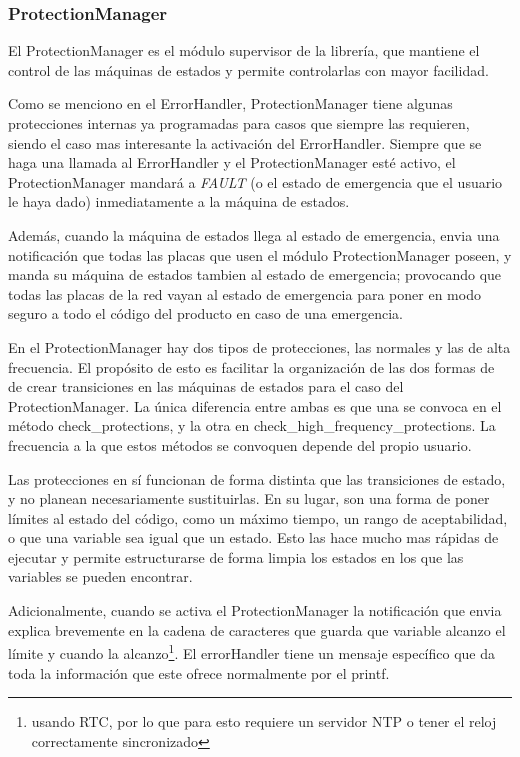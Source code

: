 \documentclass{report}
\begin{document}
\subsubsection{ProtectionManager}
El ProtectionManager es el módulo supervisor de la librería, que mantiene el control de las máquinas de estados y permite controlarlas con mayor facilidad. 
\par \vspace{0.3cm}
Como se menciono en el ErrorHandler, ProtectionManager tiene algunas protecciones internas ya programadas para casos que siempre las requieren, siendo el caso mas interesante la activación del ErrorHandler. Siempre que se haga una llamada al ErrorHandler y el ProtectionManager esté activo, el ProtectionManager mandará a \textit{FAULT} (o el estado de emergencia que el usuario le haya dado) inmediatamente a la máquina de estados. 
\par \vspace{0.3cm}
Además, cuando la máquina de estados llega al estado de emergencia, envia una notificación que todas las placas que usen el módulo ProtectionManager poseen, y manda su máquina de estados tambien al estado de emergencia; provocando que todas las placas de la red vayan al estado de emergencia para poner en modo seguro a todo el código del producto en caso de una emergencia. 
\par \vspace{0.3cm}
En el ProtectionManager hay dos tipos de protecciones, las normales y las de alta frecuencia. El propósito de esto es facilitar la organización de las dos formas de de crear transiciones en las máquinas de estados para el caso del ProtectionManager. La única diferencia entre ambas es que una se convoca en el método check\_protections, y la otra en check\_high\_frequency\_protections. La frecuencia a la que estos métodos se convoquen depende del propio usuario. 
\par \vspace{0.3cm}
Las protecciones en sí funcionan de forma distinta que las transiciones de estado, y no planean necesariamente sustituirlas. En su lugar, son una forma de poner límites al estado del código, como un máximo tiempo, un rango de aceptabilidad, o que una variable sea igual que un estado. Esto las hace mucho mas rápidas de ejecutar y permite estructurarse de forma limpia los estados en los que las variables se pueden encontrar. \par 
Adicionalmente, cuando se activa el ProtectionManager la notificación que envia explica brevemente en la cadena de caracteres que guarda que variable alcanzo el límite y cuando la alcanzo\footnote{usando RTC, por lo que para esto requiere un servidor NTP o tener el reloj correctamente sincronizado}. El errorHandler tiene un mensaje específico que da toda la información que este ofrece normalmente por el printf. 
\end{document}
